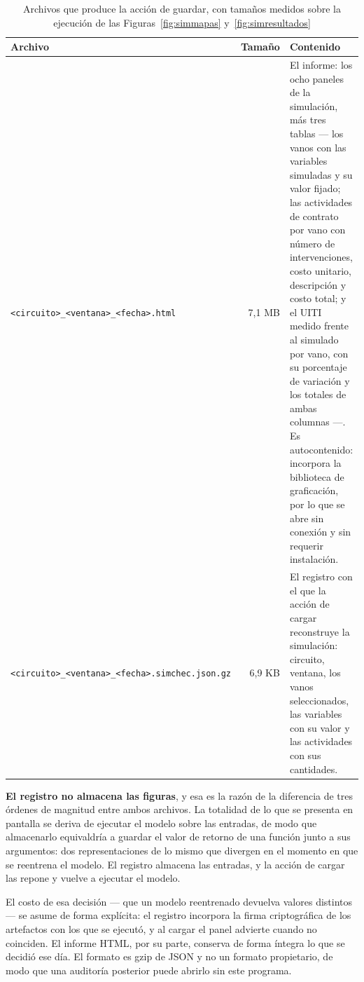 \documentclass[11pt,a4paper]{article}
\begin{document}
\begin{table}[H]
\centering
\caption{Archivos que produce la acción de guardar, con tamaños medidos sobre la ejecución de
las Figuras~\ref{fig:simmapas} y~\ref{fig:simresultados}}
\label{tab:archivos}
\footnotesize
\begin{tabularx}{\textwidth}{L{4.6cm} r X}
\toprule
\textbf{Archivo} & \textbf{Tamaño} & \textbf{Contenido} \\
\midrule
\texttt{<circuito>\_<ventana>\_}\-\texttt{<fecha>.html} & 7,1 MB &
El informe: los ocho paneles de la simulación, más tres tablas --- los vanos con las variables
simuladas y su valor fijado; las actividades de contrato por vano con número de intervenciones,
costo unitario, descripción y costo total; y el UITI medido frente al simulado por vano, con su
porcentaje de variación y los totales de ambas columnas ---. Es autocontenido: incorpora la
biblioteca de graficación, por lo que se abre sin conexión y sin requerir instalación. \\
\addlinespace
\texttt{<circuito>\_<ventana>\_}\-\texttt{<fecha>.simchec.json.gz} & 6,9 KB &
El registro con el que la acción de cargar reconstruye la simulación: circuito, ventana, los
vanos seleccionados, las variables con su valor y las actividades con sus cantidades. \\
\bottomrule
\end{tabularx}
\end{table}

\textbf{El registro no almacena las figuras}, y esa es la razón de la diferencia de tres órdenes
de magnitud entre ambos archivos. La totalidad de lo que se presenta en pantalla se deriva de
ejecutar el modelo sobre las entradas, de modo que almacenarlo equivaldría a guardar el valor de
retorno de una función junto a sus argumentos: dos representaciones de lo mismo que divergen en
el momento en que se reentrena el modelo. El registro almacena las entradas, y la acción de
cargar las repone y vuelve a ejecutar el modelo.

El costo de esa decisión --- que un modelo reentrenado devuelva valores distintos --- se asume de
forma explícita: el registro incorpora la firma criptográfica de los artefactos con los que se
ejecutó, y al cargar el panel advierte cuando no coinciden. El informe HTML, por su parte,
conserva de forma íntegra lo que se decidió ese día. El formato es gzip de JSON y no un formato
propietario, de modo que una auditoría posterior puede abrirlo sin este programa.
\end{document}

